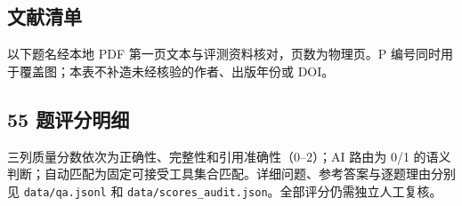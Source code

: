 \documentclass[UTF8,a4paper,zihao=-4,fontset=none]{ctexart}
\newcommand{\code}[1]{{\small\nolinkurl{#1}}}
\begin{document}
\subsection{文献清单}
以下题名经本地 PDF 第一页文本与评测资料核对，页数为物理页。P 编号同时用于覆盖图；本表不补造未经核验的作者、出版年份或 DOI。
\begingroup\small

\endgroup

\subsection{55 题评分明细}
三列质量分数依次为正确性、完整性和引用准确性（0--2）；AI 路由为 0/1 的语义判断；自动匹配为固定可接受工具集合匹配。详细问题、参考答案与逐题理由分别见 \code{data/qa.jsonl} 和 \code{data/scores_audit.json}。全部评分仍需独立人工复核。
\begingroup\small

\endgroup
\end{document}
